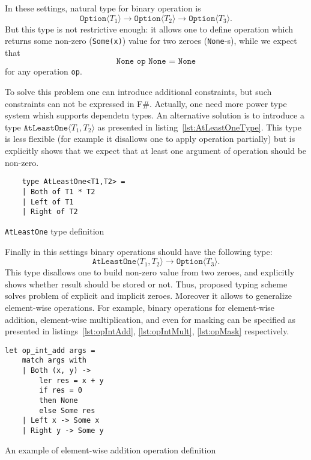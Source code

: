 In these settings, natural type for binary operation is $$\texttt{Option}\langle T_1 \rangle \to \texttt{Option}\langle T_2 \rangle \to \texttt{Option}\langle T_3 \rangle.$$ But this type is not restrictive enough: it allows one to define operation which returns some non-zero (\texttt{Some(x)}) value for two zeroes (\texttt{None}-s), while we expect that $$\texttt{None op None = None}$$ for any operation \texttt{op}.   

To solve this problem one can introduce additional constraints, but such constraints can not be expressed in F\#.
Actually, one need more power type system whish supports dependetn types.
An alternative solution is to introduce a type $\texttt{AtLeastOne} \langle T_1, T_2 \rangle$ as presented in listing~\ref{lst:AtLeastOneType}. This type is less flexible (for example it disallows one to apply operation partially) but is explicitly shows that we expect that at least one argument of operation should be non-zero. 

\begin{listing}[h]
    \begin{verbatim}
    type AtLeastOne<T1,T2> =
    | Both of T1 * T2
    | Left of T1
    | Right of T2
    \end{verbatim}
    \caption{\texttt{AtLeastOne} type definition}
    \label{lst:AtLeastOneType}
\end{listing}

Finally in this settings binary operations should have the following type: $$\texttt{AtLeastOne} \langle T_1, T_2 \rangle \to \texttt{Option}\langle T_3 \rangle.$$
This type disallows one to build non-zero value from two zeroes, and explicitly shows whether result should be stored or not.
Thus, proposed typing scheme solves problem of explicit and implicit zeroes.
Moreover it allows to generalize element-wise operations.
For example, binary operations for element-wise addition, element-wise multiplication, and even for masking can be specified as presented in listings~\ref{lst:opIntAdd}, \ref{lst:opIntMult}, \ref{lst:opMask} respectively.

\begin{listing}[h]
    \begin{verbatim}
let op_int_add args =
    match args with
    | Both (x, y) -> 
        ler res = x + y 
        if res = 0 
        then None 
        else Some res 
    | Left x -> Some x
    | Right y -> Some y
    \end{verbatim}
    \caption{An example of element-wise addition operation definition}
    \label{lst:opIntAdd}
\end{listing}

